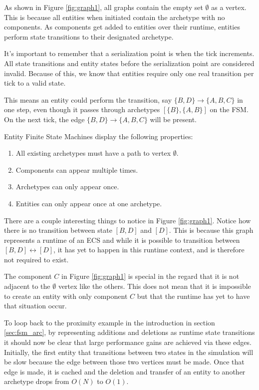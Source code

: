 As shown in Figure \ref{fig:graph1}, all graphs contain the empty set $\emptyset$ as a vertex. This is because all entities when initiated contain the archetype with no components. As components get added to entities over their runtime, entities perform state transitions to their designated archetype.

It's important to remember that a serialization point is when the tick increments. All state transitions and entity states before the serialization point are considered invalid. Because of this, we know that entities require only one real transition per tick to a valid state. 

This means an entity could perform the transition, say $\{B,D\} \rightarrow \{A,B,C\}$ in one step, even though it passes through archetypes $[\{B\}, \{A,B\}]$ on the FSM. On the next tick, the edge $\{B,D\} \rightarrow \{A,B,C\}$ will be present. 

Entity Finite State Machines display the following properties:

\begin{enumerate}
    \item All existing archetypes must have a path to vertex $\emptyset$.
    \item Components can appear multiple times.
    \item Archetypes can only appear once.
    \item Entities can only appear once at one archetype.
\end{enumerate}

There are a couple interesting things to notice in Figure \ref{fig:graph1}. Notice how there is no transition between state $[B,D]$ and $[D]$. This is because this graph represents a runtime of an ECS and while it is possible to transition between $[B,D] \leftrightarrow [D]$, it has yet to happen in this runtime context, and is therefore not required to exist. 

The component $C$ in Figure \ref{fig:graph1} is special in the regard that it is not adjacent to the $\emptyset$ vertex like the others. This does not mean that it is impossible to create an entity with only component $C$ but that the runtime has yet to have that situation occur.

To loop back to the proximity example in the introduction in section \ref{sec:fsm_arc}, by representing additions and deletions as runtime state transitions it should now be clear that large performance gains are achieved via these edges. Initially, the first entity that transitions between two states in the simulation will be slow because the edge between those two vertices must be made. Once that edge is made, it is cached and the deletion and transfer of an entity to another archetype drops from $O(N)$ to $O(1)$.

